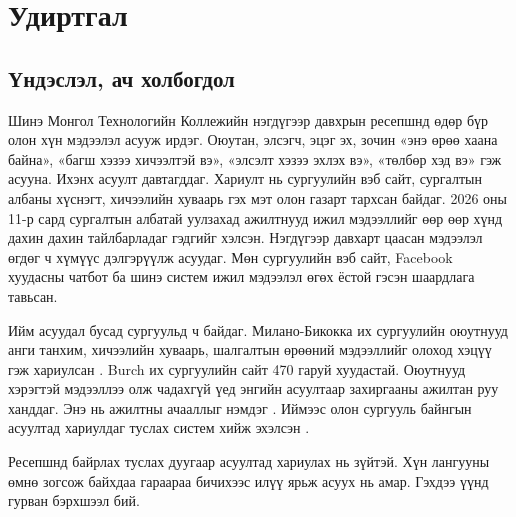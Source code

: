 \chapter{Удиртгал}
\label{ch:introduction}


\section{Үндэслэл, ач холбогдол}
\label{sec:intro-background}

Шинэ Монгол Технологийн Коллежийн нэгдүгээр давхрын ресепшнд өдөр бүр олон хүн мэдээлэл асууж ирдэг. Оюутан, элсэгч, эцэг эх, зочин «энэ өрөө хаана байна», «багш хэзээ хичээлтэй вэ», «элсэлт хэзээ эхлэх вэ», «төлбөр хэд вэ» гэж асууна. Ихэнх асуулт давтагддаг. Хариулт нь сургуулийн вэб сайт, сургалтын албаны хүснэгт, хичээлийн хуваарь гэх мэт олон газарт тархсан байдаг.
2026 оны 11-р сард сургалтын албатай уулзахад ажилтнууд ижил мэдээллийг өөр өөр хүнд дахин дахин тайлбарладаг гэдгийг хэлсэн. Нэгдүгээр давхарт цаасан мэдээлэл өгдөг ч хүмүүс дэлгэрүүлж асуудаг. Мөн сургуулийн вэб сайт, Facebook хуудасны чатбот ба шинэ систем ижил мэдээлэл өгөх ёстой гэсэн шаардлага тавьсан.

Ийм асуудал бусад сургуульд ч байдаг. Милано-Бикокка их сургуулийн оюутнууд анги танхим, хичээлийн хуваарь, шалгалтын өрөөний мэдээллийг олоход хэцүү гэж хариулсан \cite{antico2024unimib}. Burch их сургуулийн сайт 470 гаруй хуудастай. Оюутнууд хэрэгтэй мэдээллээ олж чадахгүй үед энгийн асуултаар захиргааны ажилтан руу ханддаг. Энэ нь ажилтны ачааллыг нэмдэг \cite{matic2026burch}. Иймээс олон сургууль байнгын асуултад хариулдаг туслах систем хийж эхэлсэн \cite{trienes2025marcel,tao2025aloha}.

Ресепшнд байрлах туслах дуугаар асуултад хариулах нь зүйтэй. Хүн лангууны өмнө зогсож байхдаа гараараа бичихээс илүү ярьж асуух нь амар. Гэхдээ үүнд гурван бэрхшээл бий.

